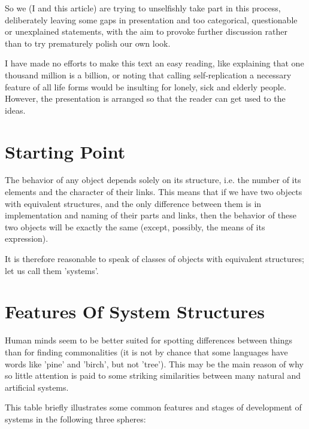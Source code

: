      So we (I and this article) are trying to unselfishly take part in
this  process,  deliberately leaving some gaps in presentation and too
categorical, questionable or unexplained statements, with the  aim  to
provoke  further  discussion rather than to try prematurely polish our
own look.

     I have made no efforts to make this text an  easy  reading,  like
explaining  that  one  thousand  million  is a billion, or noting that
calling self-replication a necessary feature of all life  forms  would
be  insulting  for  lonely,  sick  and  elderly  people.  However, the
presentation is arranged so that the reader can get used to the ideas.


\section{Starting Point}

             The behavior of any object  depends  solely  on  its
        structure,  i.e.   the  number  of  its  elements and the
        character of their links.  This means that if we have two
        objects   with   equivalent   structures,  and  the  only
        difference between them is in implementation  and  naming
        of  their parts and links, then the behavior of these two
        objects will be exactly the same (except,  possibly,  the
        means of its expression).

             It is therefore reasonable to speak  of  classes  of
        objects  with  equivalent  structures;  let  us call them
        'systems'.


\section{Features Of System Structures}

     Human minds seem to be better  suited  for  spotting  differences
between  things  than  for  finding commonalities (it is not by chance
that some languages have  words  like  'pine'  and  'birch',  but  not
'tree').   This  may  be the main reason of why so little attention is
paid to some striking similarities between many natural and artificial
systems.


     This table briefly illustrates some common features and stages of
development of systems in the following three spheres:

